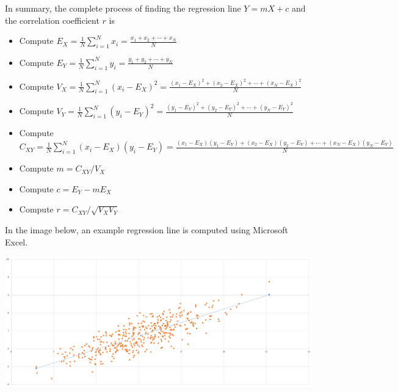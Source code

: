 \documentclass{article}
\begin{document}
In summary, the complete process of finding the regression line \(Y = mX + c\) and the correlation coefficient \(r\) is 
\begin{itemize}
\item Compute \(E_X = \frac{1}{N}\sum_{i=1}^N x_i = \frac{x_1 + x_2 + \cdots + x_N}{N}\) 
\item Compute \(E_Y = \frac{1}{N}\sum_{i=1}^N y_i = \frac{y_1 + y_2 + \cdots + y_N}{N}\) 
\item Compute \(V_X = \frac{1}{N}\sum_{i=1}^N (x_i - E_X)^2 = \frac{(x_1 - E_X)^2 + (x_2 - E_X)^2 + \cdots + (x_N - E_X)^2}{N}\) 
\item Compute \(V_Y = \frac{1}{N}\sum_{i=1}^N (y_i - E_Y)^2 = \frac{(y_1 - E_Y)^2 + (y_2 - E_Y)^2 + \cdots + (y_N - E_Y)^2}{N}\) 
\item Compute \(C_{XY} = \frac{1}{N}\sum_{i=1}^N (x_i - E_X)(y_i - E_Y) = \frac{(x_1 - E_X)(y_1 - E_Y) + (x_2 - E_X)(y_2 - E_Y) + \cdots + (x_N - E_X)(y_N - E_Y)}{N}\) 
\item Compute \(m = C_{XY}/V_X\) 
\item Compute \(c = E_Y - mE_X\) 
\item Compute \(r = C_{XY}/\sqrt{V_X V_Y}\)
\end{itemize}

In the image below, an example regression line is computed using Microsoft Excel.

\includegraphics[width = \textwidth]{Linear_regression_example}


\end{document}
